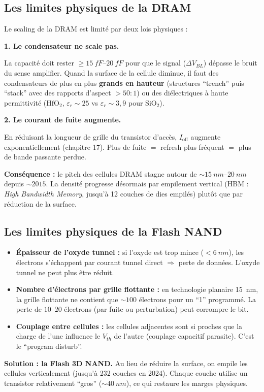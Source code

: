 \documentclass[12pt,a4paper,twoside]{book}
\begin{document}
\subsection{Les limites physiques de la DRAM}

\begin{formule}
Le scaling de la DRAM est limité par deux lois physiques :

\textbf{1. Le condensateur ne scale pas.}

La capacité doit rester $\geq \SI{15}{fF}$--$\SI{20}{fF}$ pour que le signal ($\Delta V_{BL}$) dépasse le bruit du sense amplifier. Quand la surface de la cellule diminue, il faut des condensateurs de plus en plus \textbf{grands en hauteur} (structures ``trench'' puis ``stack'' avec des rapports d'aspect $> 50:1$) ou des diélectriques à haute permittivité ($\text{HfO}_2$, $\varepsilon_r \sim 25$ vs $\varepsilon_r \sim 3{,}9$ pour $\text{SiO}_2$).

\textbf{2. Le courant de fuite augmente.}

En réduisant la longueur de grille du transistor d'accès, $I_{\text{off}}$ augmente exponentiellement (chapitre 17). Plus de fuite $=$ refresh plus fréquent $=$ plus de bande passante perdue.

\textbf{Conséquence :} le pitch des cellules DRAM stagne autour de $\sim\SI{15}{nm}$--$\SI{20}{nm}$ depuis $\sim 2015$. La densité progresse désormais par empilement vertical (HBM : \textit{High Bandwidth Memory}, jusqu'à 12 couches de dies empilés) plutôt que par réduction de la surface.
\end{formule}

\subsection{Les limites physiques de la Flash NAND}

\begin{formule}
\begin{itemize}[nosep]
\item \textbf{Épaisseur de l'oxyde tunnel :} si l'oxyde est trop mince ($< \SI{6}{nm}$), les électrons s'échappent par courant tunnel direct $\Rightarrow$ perte de données. L'oxyde tunnel ne peut plus être réduit.
\item \textbf{Nombre d'électrons par grille flottante :} en technologie planaire \SI{15}{nm}, la grille flottante ne contient que $\sim 100$ électrons pour un ``1'' programmé. La perte de $10$--$20$ électrons (par fuite ou perturbation) peut corrompre le bit.
\item \textbf{Couplage entre cellules :} les cellules adjacentes sont si proches que la charge de l'une influence le $V_{th}$ de l'autre (couplage capacitif parasite). C'est le ``program disturb''.
\end{itemize}

\textbf{Solution : la Flash 3D NAND.} Au lieu de réduire la surface, on empile les cellules verticalement (jusqu'à 232 couches en 2024). Chaque couche utilise un transistor relativement ``gros'' ($\sim\SI{40}{nm}$), ce qui restaure les marges physiques.
\end{formule}
\end{document}
